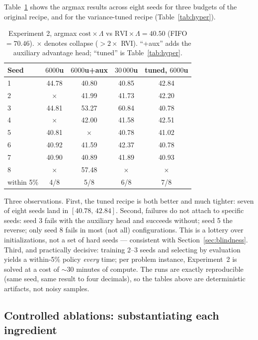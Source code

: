 \documentclass[11pt,a4paper]{article}
\begin{document}
Table~\ref{tab:exp2} shows the argmax results across eight seeds for
three budgets of the original recipe, and for the variance-tuned recipe
(Table~\ref{tab:hyper}).

\begin{table}[h]
\centering
\caption{Experiment 2, argmax $\mathrm{cost}\times\Lambda$ vs
$\mathrm{RVI}\times\Lambda = 40.50$ (FIFO $= 70.46$).  $\times$ denotes
collapse ($> 2\times$ RVI).  ``+aux'' adds the auxiliary advantage head;
``tuned'' is Table~\ref{tab:hyper}.}
\label{tab:exp2}
\begin{tabular}{lcccc}
\toprule
Seed & $6000$u & $6000$u+aux & $30\,000$u & tuned, $6000$u \\
\midrule
1 & 44.78 & 40.80 & 40.85 & 42.84 \\
2 & $\times$ & 41.99 & 41.73 & 42.20 \\
3 & 44.81 & 53.27 & 60.84 & 40.78 \\
4 & $\times$ & 42.00 & 41.58 & 42.51 \\
5 & 40.81 & $\times$ & 40.78 & 41.02 \\
6 & 40.92 & 41.59 & 42.37 & 40.78 \\
7 & 40.90 & 40.89 & 41.89 & 40.93 \\
8 & $\times$ & 57.48 & $\times$ & $\times$ \\
\midrule
within 5\% & 4/8 & 5/8 & 6/8 & 7/8\footnotemark \\
\bottomrule
\end{tabular}
\end{table}

Three observations.  First, the tuned recipe is both better and much
tighter: seven of eight seeds land in $[40.78,\, 42.84]$.  Second,
failures do not attach to specific seeds: seed 3 fails with the
auxiliary head and succeeds without; seed 5 the reverse; only seed 8
fails in most (not all) configurations.  This is a lottery over
initializations, not a set of hard seeds --- consistent with
Section~\ref{sec:blindness}.  Third, and practically decisive: training
2--3 seeds and selecting by evaluation yields a within-5\% policy
\emph{every} time; per problem instance, Experiment~2 is solved at a
cost of ${\sim}30$ minutes of compute.  The runs are exactly
reproducible (same seed, same result to four decimals), so the tables
above are deterministic artifacts, not noisy samples.

\subsection{Controlled ablations: substantiating each ingredient}
\label{sec:ablation}
\end{document}

